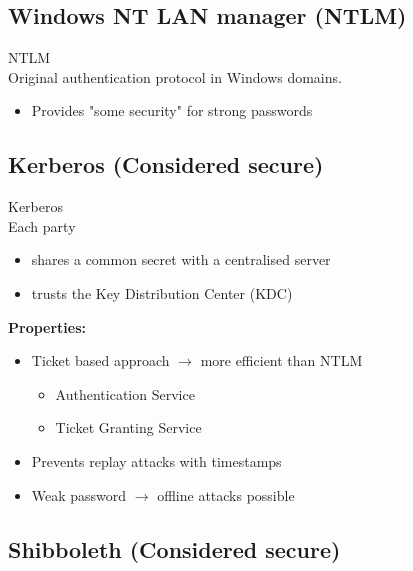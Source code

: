 \subsection{Windows NT LAN manager (NTLM)}

\begin{concept}{NTLM}\\
    Original authentication protocol in Windows domains.
    \begin{itemize}
        \item Provides "some security" for strong passwords
    \end{itemize}
\end{concept}


\subsection{Kerberos (Considered secure)}

\begin{definition}{Kerberos}\\
    Each party
    \begin{itemize}
        \item shares a common secret with a centralised server
        \item trusts the Key Distribution Center (KDC)
    \end{itemize}
    
    \textbf{Properties:}
    \begin{itemize}
        \item Ticket based approach $\rightarrow$ more efficient than NTLM
        \begin{itemize}
            \item Authentication Service
            \item Ticket Granting Service
        \end{itemize}
        \item Prevents replay attacks with timestamps
        \item Weak password $\rightarrow$ offline attacks possible
    \end{itemize}
\end{definition}


\subsection{Shibboleth (Considered secure)}


